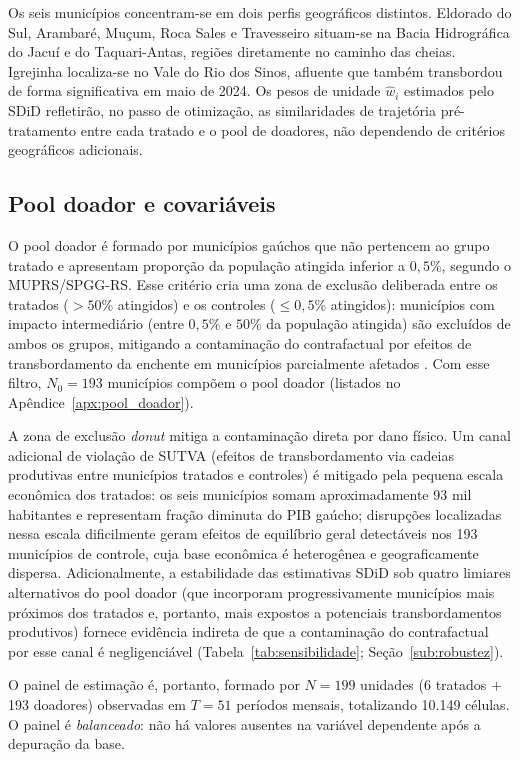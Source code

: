 \documentclass[a4paper,12pt]{article}
\begin{document}
Os seis municípios concentram-se em dois perfis geográficos distintos. Eldorado do Sul,
Arambaré, Muçum, Roca Sales e Travesseiro situam-se na Bacia Hidrográfica do Jacuí e
do Taquari-Antas, regiões diretamente no caminho das cheias. Igrejinha localiza-se no Vale
do Rio dos Sinos, afluente que também transbordou de forma significativa em maio de 2024.
Os pesos de unidade $\hat{w}_i$ estimados pelo SDiD refletirão, no passo de otimização,
as similaridades de trajetória pré-tratamento entre cada tratado e o pool de doadores, não
dependendo de critérios geográficos adicionais.

\subsection{Pool doador e covariáveis}
\label{sub:pool}

O pool doador é formado por municípios gaúchos que não pertencem ao grupo tratado e
apresentam proporção da população atingida inferior a $0{,}5\%$, segundo o MUPRS/SPGG-RS.
Esse critério cria uma zona de exclusão deliberada entre os tratados
($>50\%$ atingidos) e os controles ($\leq 0{,}5\%$ atingidos): municípios com impacto
intermediário (entre $0{,}5\%$ e $50\%$ da população atingida) são excluídos de
ambos os grupos, mitigando a contaminação do contrafactual por efeitos de transbordamento
da enchente em municípios parcialmente afetados \cite{abadie2021}. Com esse filtro,
$N_0 = 193$ municípios compõem o pool doador
(listados no Apêndice~\ref{apx:pool_doador}).

A zona de exclusão \textit{donut} mitiga a contaminação direta por dano físico. Um canal
adicional de violação de SUTVA (efeitos de transbordamento via cadeias produtivas entre
municípios tratados e controles) é mitigado pela pequena escala econômica dos tratados:
os seis municípios somam aproximadamente 93 mil habitantes e representam fração diminuta
do PIB gaúcho; disrupções localizadas nessa escala dificilmente geram efeitos de
equilíbrio geral detectáveis nos 193 municípios de controle, cuja base econômica é
heterogênea e geograficamente dispersa. Adicionalmente, a estabilidade das estimativas
SDiD sob quatro limiares alternativos do pool doador (que incorporam progressivamente
municípios mais próximos dos tratados e, portanto, mais expostos a potenciais
transbordamentos produtivos) fornece evidência indireta de que a contaminação do
contrafactual por esse canal é negligenciável
(Tabela~\ref{tab:sensibilidade}; Seção~\ref{sub:robustez}).

O painel de estimação é, portanto, formado por $N = 199$ unidades (6 tratados $+$
193 doadores) observadas em $T = 51$ períodos mensais, totalizando 10.149 células.
O painel é \emph{balanceado}: não há valores ausentes na variável dependente após a
depuração da base.
\end{document}
